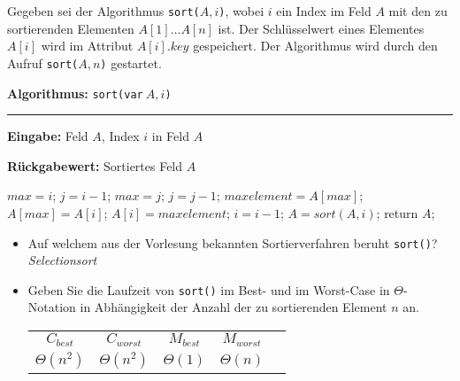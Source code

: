 \documentclass[a4paper, 12pt]{article}
\begin{document}
\begin{angabe}

\newcommand{\NULL}{\ensuremath{\mathtt{NULL}}}
\newcommand{\aif}{\ensuremath{\mathbf{if}}}
\newcommand{\ret}{\ensuremath{\mathbf{return}}}

Gegeben sei der Algorithmus \texttt{sort(}$A,i$\texttt),
wobei $i$ ein Index im Feld $A$ mit den zu sortierenden Elementen
$A[1] \ldots A[n]$ ist. Der Schlüsselwert eines Elementes $A[i]$ wird
im Attribut $A[i].key$ gespeichert.
Der Algorithmus wird durch den Aufruf \texttt{sort(}$A,n$\texttt)
gestartet.

\bigskip

\begin{minipage}{8.5cm}
\textbf{Algorithmus:} \texttt{sort(var}$~A,i$\texttt)
\hrule
\begin{algorithmic}
\item[\textbf{Eingabe:}] Feld $A$, Index $i$ in Feld $A$
\item[\textbf{Rückgabewert:}] Sortiertes Feld $A$
\item[{}]
	    \ZEILE $max = i$;
	    \ZEILE $j=i-1$;
		  \ZEILE $max=j$;
	      \ENDFALLS
	      \ZEILE $j=j-1$;
	    \ENDSOLANGE
	    \ZEILE $maxelement = A[max]$;
	    \ZEILE $A[max] = A[i]$;
	    \ZEILE $A[i] = maxelement$; 
	    \ZEILE $i = i -1$;
	    \ZEILE $A = sort(A,i)$;
	\ENDFALLS
	\ZEILE return $A$;

\end{algorithmic}
\end{minipage}
\begin{minipage}{6.5cm}
\begin{itemize}
\item Auf welchem aus der Vorlesung bekannten Sortierverfahren
	beruht \texttt{sort()}?
	\newline
\textit{Selectionsort}


\item
Geben Sie die Laufzeit von \texttt{sort()} im Best- und im Worst-Case in
$\Theta$-Notation in Abhängigkeit der Anzahl der zu sortierenden Element
$n$ an.

\begin{tabular}{ c c c c c}
$C_{best}$ & $C_{worst}$ & $M_{best}$ & $M_{worst} $ \\
$\Theta(n^2)$ & $\Theta(n^2)$ & $\Theta(1)$ & $\Theta(n)$ \\


\end{tabular}
\end{itemize}
\end{minipage}
\end{angabe}
\end{document}
